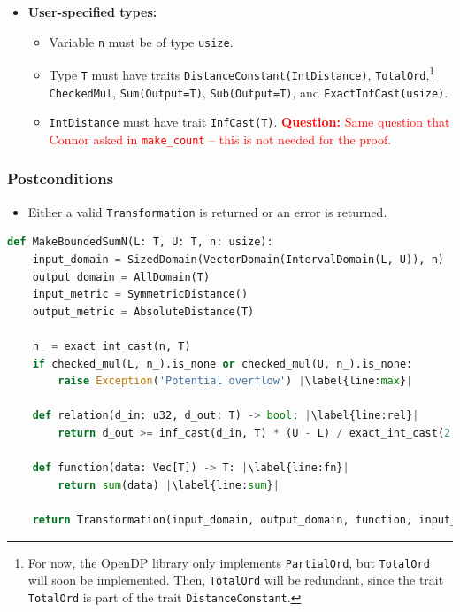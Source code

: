 \documentclass[11pt,a4paper]{article}
\theoremstyle{definition}
\newcommand{\questionc}[1]{\textcolor{red}{\textbf{Question:} #1}}
\begin{document}
\begin{itemize}
    \item \textbf{User-specified types:}
    \begin{itemize}
        \item Variable \texttt{n} must be of type \texttt{usize}.
        \item Type \texttt{T} must have traits \texttt{DistanceConstant(IntDistance)}, \texttt{TotalOrd},\footnote{For now, the OpenDP library only implements \texttt{PartialOrd}, but \texttt{TotalOrd} will soon be implemented. Then, \texttt{TotalOrd} will be redundant, since the trait \texttt{TotalOrd} is part of the trait \texttt{DistanceConstant}.} \texttt{CheckedMul}, \texttt{Sum(Output=T)}, \texttt{Sub(Output=T)},  and \texttt{ExactIntCast(usize)}.
        \item \texttt{IntDistance} must have trait \texttt{InfCast(T)}. \questionc{Same question that Connor asked in \texttt{make\_count} -- this is not needed for the proof.}
\end{itemize}
\end{itemize}

\subsubsection*{Postconditions}
\begin{itemize}
    \item Either a valid \texttt{Transformation} is returned or an error is returned.
\end{itemize}

\begin{lstlisting}[language=Python, escapechar=|]
def MakeBoundedSumN(L: T, U: T, n: usize):
    input_domain = SizedDomain(VectorDomain(IntervalDomain(L, U)), n)
    output_domain = AllDomain(T)
    input_metric = SymmetricDistance()
    output_metric = AbsoluteDistance(T)
    
    n_ = exact_int_cast(n, T)
    if checked_mul(L, n_).is_none or checked_mul(U, n_).is_none: 
        raise Exception('Potential overflow') |\label{line:max}|
    
    def relation(d_in: u32, d_out: T) -> bool: |\label{line:rel}|
        return d_out >= inf_cast(d_in, T) * (U - L) / exact_int_cast(2, T)
    
    def function(data: Vec[T]) -> T: |\label{line:fn}|
        return sum(data) |\label{line:sum}|
    
    return Transformation(input_domain, output_domain, function, input_metric, output_metric, stability_relation = relation)
\end{lstlisting}
\end{document}

